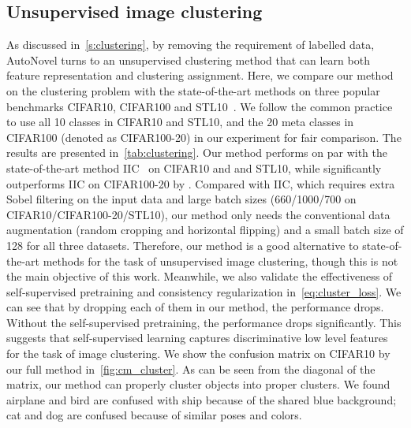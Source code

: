 \subsection{Unsupervised image clustering}
As discussed in~\cref{s:clustering}, by removing the requirement of labelled data, AutoNovel turns to an unsupervised clustering method that can learn both feature representation and clustering assignment.
Here, we compare our method on the clustering problem with the state-of-the-art methods on three popular benchmarks CIFAR10, CIFAR100 and STL10~\cite{Coates11STL10}.
We follow the common practice to use all 10 classes in CIFAR10 and STL10, and the 20 meta classes in CIFAR100 (denoted as CIFAR100-20) in our experiment for fair comparison.
The results are presented in~\cref{tab:clustering}.
Our method performs on par with the state-of-the-art method IIC~\cite{ji2019invariant} on CIFAR10 and and STL10, while significantly outperforms IIC on CIFAR100-20 by .
Compared with IIC, which requires extra Sobel filtering on the input data and large batch sizes (660/1000/700 on CIFAR10/CIFAR100-20/STL10), our method only needs the conventional data augmentation (random cropping and horizontal flipping) and a small batch size of 128 for all three datasets.
Therefore, our method is a good alternative to state-of-the-art methods for the task of unsupervised image clustering, though this is not the main objective of this work.
Meanwhile, we also validate the effectiveness of self-supervised pretraining and consistency regularization in~\cref{eq:cluster_loss}.
We can see that by dropping each of them in our method, the performance drops.
Without the self-supervised pretraining, the performance drops significantly. This suggests that self-supervised learning captures discriminative low level features for the task of image clustering. 
We show the confusion matrix on CIFAR10 by our full method in~\cref{fig:cm_cluster}.
As can be seen from the diagonal of the matrix, our method can properly cluster objects into proper clusters.
We found airplane and bird are confused with ship because of the shared blue background; cat and dog are confused because of similar poses and colors.


